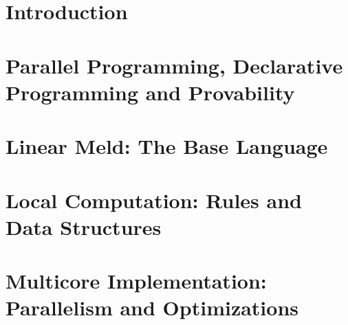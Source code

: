 \documentclass[12pt]{cmuthesis}
\theoremstyle{indented}
\begin{document}

\thispagestyle{empty}
\clearpage

\frontmatter


\begin{acknowledgments}

\end{acknowledgments}

\tableofcontents
\listoffigures
\listoftables
\renewcommand{\listtheoremname}{List of Equations}
\listoftheorems

\mainmatter


%
%
%
%
%

\mainmatter
\chapter{Introduction}


\chapter{Parallel Programming, Declarative Programming and Provability}


\chapter{Linear Meld: The Base Language}



\chapter{Local Computation: Rules and Data Structures}

\chapter{Multicore Implementation: Parallelism and Optimizations}\label{chapter:implementation}

\end{document}
